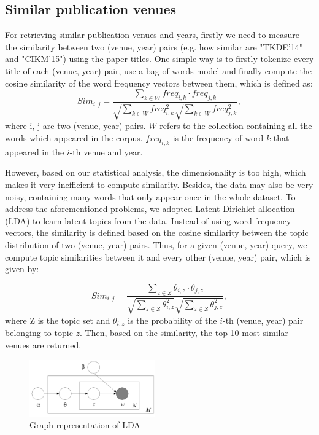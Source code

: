 \documentclass{sig-alternate-05-2015}
\begin{document}
\subsection{Similar publication venues}
For retrieving similar publication venues and years, firstly we need to measure the similarity between two (venue, year) pairs (e.g. how similar are "TKDE'14" and "CIKM'15") using the paper titles. One simple way is to firstly tokenize every title of each (venue, year) pair, use a bag-of-words model and finally compute the cosine similarity of the word frequency vectors between them, which is defined as:
\begin{equation*}
  Sim_{i, j} = \frac{\sum_{k\in W}freq_{i,k} \cdot freq_{j,k}}{\sqrt{\sum_{k\in W}freq_{i,k}^2}\sqrt{\sum_{k\in W}freq_{j,k}^2}},
\end{equation*}
where i, j are two (venue, year) pairs. $W$ refers to the collection containing all the words which appeared in the corpus. $freq_{i,k}$ is the frequency of word $k$ that appeared in the $i$-th venue and year.

However, based on our statistical analysis, the dimensionality is too high, which makes it very inefficient to compute similarity. Besides, the data may also be very noisy, containing many words that only appear once in the whole dataset. To address the aforementioned problems, we adopted Latent Dirichlet allocation (LDA)\cite{blei2003latent} to learn latent topics from the data. Instead of using word frequency vectors, the similarity is defined based on the cosine similarity between the topic distribution of two (venue, year) pairs. Thus, for a given (venue, year) query, we compute topic similarities between it and every other (venue, year) pair, which is given by:

\begin{equation*}
  Sim_{i, j} = \frac{\sum_{z\in Z}\theta_{i,z} \cdot \theta_{j,z}}{\sqrt{\sum_{z\in Z}\theta_{i,z}^2}\sqrt{\sum_{z\in Z}\theta_{j,z}^2}},
\end{equation*}
where Z is the topic set and $\theta_{i,z}$ is the probability of the $i$-th (venue, year) pair belonging to topic $z$. Then, based on the similarity, the top-10 most similar venues are returned.

\begin{figure}[th]
\centering
\includegraphics[width=0.48\textwidth]{img/LDA}
\caption{Graph representation of LDA}
\label{fig:lda}
\end{figure}
\end{document}
